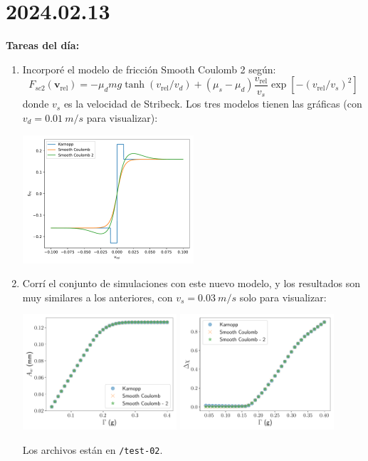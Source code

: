 \documentclass[11pt]{article}
\begin{document}
\section*{2024.02.13}
\textbf{Tareas del día:}
\begin{enumerate}
    \item Incorporé el modelo de fricción Smooth Coulomb 2 según:
        \[ F_{sc2}(\bm{v}_{\text{rel}}) = -\mu_d m g \tanh(v_{\text{rel}} / v_d) + (\mu_s - \mu_d) \frac{v_{\text{rel}}}{v_s} \exp[-(v_{\text{rel}}/v_s)^2] \]
        donde $v_s$ es la velocidad de Stribeck. Los tres modelos tienen las gráficas (con $v_d = \qty{0.01}{m/s}$ para visualizar):
        \begin{center}
            \includegraphics[width=0.5\textwidth]{figs/froce-3.pdf}
        \end{center}
    \item Corrí el conjunto de simulaciones con este nuevo modelo, y los resultados son muy similares a los anteriores, con $v_s = \qty{0.03}{m/s}$ solo para visualizar:
        \begin{center}
            \includegraphics[width=0.45\textwidth]{figs/Fig_2_comp3.pdf} 
            \includegraphics[width=0.45\textwidth]{figs/Fig_3_comp3.pdf} 
        \end{center}
    Los archivos están en \texttt{/test-02}.
\end{enumerate}
\end{document}
